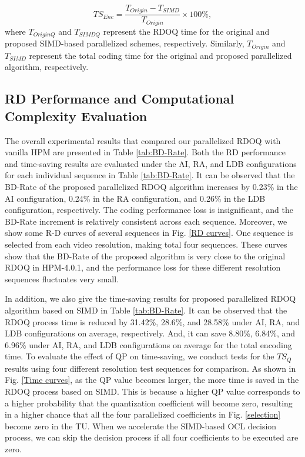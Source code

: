 \documentclass[lettersize,journal]{IEEEtran}
\begin{document}
\begin{equation}
	\label{TSEnc}
	TS_{Enc} = \frac{T_{Origin}-T_{SIMD}}{T_{Origin}} \times 100\%,
\end{equation}
where $T_{OriginQ}$ and $T_{SIMDQ}$ represent the RDOQ time for the original and proposed SIMD-based parallelized schemes, respectively. Similarly, $T_{Origin}$ and $T_{SIMD}$ represent the total coding time for the original and proposed parallelized algorithm, respectively. 

\subsection{RD Performance and Computational Complexity Evaluation}
The overall experimental results that compared our parallelized RDOQ with vanilla HPM are presented in Table \ref{tab:BD-Rate}. Both the RD performance and time-saving results are evaluated under the AI, RA, and LDB configurations for each individual sequence in Table \ref{tab:BD-Rate}. It can be observed that the BD-Rate of the proposed parallelized RDOQ algorithm increases by 0.23\% in the AI configuration, 0.24\% in the RA configuration, and 0.26\% in the LDB configuration, respectively. The coding performance loss is insignificant, and the BD-Rate increment is relatively consistent across each sequence. Moreover, we show some R-D curves of several sequences in Fig. \ref{RD curves}. One sequence is selected from each video resolution, making total four sequences. These curves show that the BD-Rate of the proposed algorithm is very close to the original RDOQ in HPM-4.0.1, and the performance loss for these different resolution sequences fluctuates very small. 

In addition, we also give the time-saving results for proposed parallelized RDOQ algorithm based on SIMD in Table \ref{tab:BD-Rate}. It can be observed that the RDOQ process time is reduced by 31.42\%, 28.6\%, and 28.58\% under AI, RA, and LDB configurations on average, respectively. And, it can save 8.80\%, 6.84\%, and 6.96\% under AI, RA, and LDB configurations on average for the total encoding time. To evaluate the effect of QP on time-saving, we conduct tests for the $TS_{Q}$ results using four different resolution test sequences for comparison. As shown in Fig. \ref{Time curves}, as the QP value becomes larger, the more time is saved in the RDOQ process based on SIMD. This is because a higher QP value corresponds to a higher probability that the quantization coefficient will become zero, resulting in a higher chance that all the four parallelized coefficients in Fig. \ref{selection} become zero in the TU. When we accelerate the SIMD-based OCL decision process, we can skip the decision process if all four coefficients to be executed are zero. 
\end{document}
